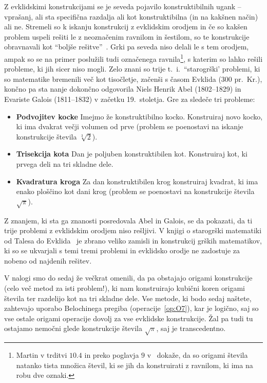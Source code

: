 Z evklidskimi konstrukcijami se je seveda pojavilo konstruktibilnih ugank -- vprašanj, ali sta specifična razdalja ali kot konstruktibilna (in na kakšnen način) ali ne. Stremeli so k iskanju konstrukcij z evklidskim orodjem in če so kakšen problem uspeli rešiti le z neoznačenim ravnilom in šestilom, so te konstrukcije obravnavali kot ``boljše rešitve''~\cite[str. 36]{royster2002}. Grki pa seveda niso delali le s tem orodjem, ampak so se na primer poslužili tudi označenega ravnila\footnote{Martin v trditvi $10.4$ in preko poglavja $9$ v~\cite{geometricconstructions} dokaže, da so origami števila natanko tista množica števil, ki se jih da konstruirati z ravnilom, ki ima na robu dve oznaki.}, s katerim so lahko rešili probleme, ki jih sicer niso mogli. Zelo znani so trije t.\ i.\ ``starogrški' problemi, ki so matematike bremenili več kot tisočletje, začenši s časom Evklida (300 pr.\ Kr.), končno pa sta nanje dokončno odgovorila Niels Henrik Abel (1802--1829) in Evariste Galois (1811--1832) v začetku 19.\ stoletja. Gre za sledeče tri probleme:
\begin{itemize}
    \item \textbf{Podvojitev kocke} Imejmo že konstruktibilno kocko. Konstruiraj novo kocko, ki ima dvakrat večji volumen od prve (problem se poenostavi na iskanje konstrukcije števila $\sqrt[3]{2}$).
    \item \textbf{Trisekcija kota} Dan je poljuben konstruktibilen kot. Konstruiraj kot, ki prvega deli na tri skladne dele.
    \item \textbf{Kvadratura kroga} Za dan konstruktibilen krog konstruiraj kvadrat, ki ima enako ploščino kot dani krog (problem se poenostavi na konstrukcije števila $\sqrt{\pi}$).
\end{itemize}

Z znanjem, ki sta ga znanosti posredovala Abel in Galois, se da pokazati, da ti trije problemi z evklidskim orodjem niso rešljivi. V knjigi o starogrški matematiki od Talesa do Evklida~\cite[str.\ 218--270]{heath1921} je zbrano veliko zamisli in konstrukcij grških matematikov, ki so se ukvarjali s temi tremi problemi in evklidsko orodje ne zadostuje za nobeno od najdenih rešitev.

V nalogi smo do sedaj že večkrat omenili, da pa obstajajo origami konstrukcije (celo več metod za isti problem!), ki nam konstruirajo kubični koren origami števila ter razdelijo kot na tri skladne dele. Vse metode, ki bodo sedaj naštete, zahtevajo uporabo Belochinega pregiba (operacije~\ref{op:O7}), kar je logično, saj so vse ostale origami operacije dovolj za vse evklidske konstrukcije. Žal pa tudi tu ostajamo nemočni glede konstrukcije števila $\sqrt{\pi}$, saj je transcedentno.

